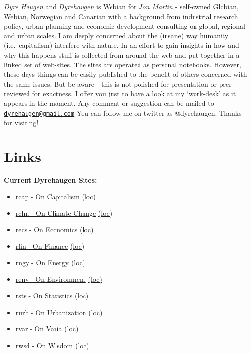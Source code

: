 \documentclass[
]{book}
\providecommand{\tightlist}{%
  \setlength{\itemsep}{0pt}\setlength{\parskip}{0pt}}
\begin{document}
\emph{Dyre Haugen} and \emph{Dyrehaugen} is Webian for \emph{Jon Martin} -
self-owned Globian, Webian, Norwegian and Canarian with
a background from industrial research policy, urban planning and
economic development consulting on global, regional and urban scales.
I am deeply concerned about the (insane) way
humanity (i.e.~capitalism) interfere with nature.
In an effort to gain insights in how and why this happens
stuff is collected from around the web and put together
in a linked set of web-sites.
The sites are operated as personal notebooks.
However, these days things can be easily published to the
benefit of others concerned with the same issues.
But be aware - this is not polished for presentation or
peer-reviewed for exactness.
I offer you just to have a look at my `work-desk' as it appears in the moment.
Any comment or suggestion can be mailed to \href{mailto:dyrehaugen@gmail.com}{\nolinkurl{dyrehaugen@gmail.com}}
You can follow me on twitter as @dyrehaugen.
Thanks for visiting!

\hypertarget{links}{%
\chapter{Links}\label{links}}

\textbf{Current Dyrehaugen Sites:}

\begin{itemize}
\tightlist
\item
  \href{https://dyrehaugen.github.io/rcap}{rcap - On Capitalism} \href{http://localhost/rcap}{(loc)}
\item
  \href{https://dyrehaugen.github.io/rclm}{rclm - On Climate Change} \href{http://localhost/rclm}{(loc)}
\item
  \href{https://dyrehaugen.github.io/recs}{recs - On Economics} \href{http://localhost/recs}{(loc)}
\item
  \href{https://dyrehaugen.github.io/rngy}{rfin - On Finance} \href{http://localhost/rfin}{(loc)}
\item
  \href{https://dyrehaugen.github.io/rngy}{rngy - On Energy} \href{http://localhost/rngy}{(loc)}
\item
  \href{https://dyrehaugen.github.io/renv}{renv - On Environment} \href{http://localhost/renv}{(loc)}
\item
  \href{https://dyrehaugen.github.io/rsts}{rsts - On Statistics} \href{http://localhost/rsts}{(loc)}
\item
  \href{https://dyrehaugen.github.io/rurb}{rurb - On Urbanization} \href{http://localhost/rurb}{(loc)}
\item
  \href{https://dyrehaugen.github.io/rvar}{rvar - On Varia} \href{http://localhost/rvar}{(loc)}
\item
  \href{https://dyrehaugen.github.io/rwsd}{rwsd - On Wisdom} \href{http://localhost/rwsd}{(loc)}
\end{itemize}
\end{document}
